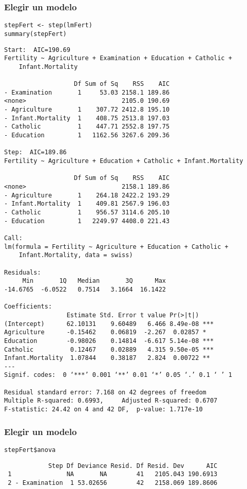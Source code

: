 \documentclass{beamer}
\begin{document}
\begin{frame}[fragile]
\frametitle{Elegir un modelo}
\label{sec-3-11}


\lstset{language=R}
\begin{lstlisting}
stepFert <- step(lmFert)
summary(stepFert)
\end{lstlisting}


\begin{verbatim}
Start:  AIC=190.69
Fertility ~ Agriculture + Examination + Education + Catholic + 
    Infant.Mortality

                   Df Sum of Sq    RSS    AIC
- Examination       1     53.03 2158.1 189.86
<none>                          2105.0 190.69
- Agriculture       1    307.72 2412.8 195.10
- Infant.Mortality  1    408.75 2513.8 197.03
- Catholic          1    447.71 2552.8 197.75
- Education         1   1162.56 3267.6 209.36

Step:  AIC=189.86
Fertility ~ Agriculture + Education + Catholic + Infant.Mortality

                   Df Sum of Sq    RSS    AIC
<none>                          2158.1 189.86
- Agriculture       1    264.18 2422.2 193.29
- Infant.Mortality  1    409.81 2567.9 196.03
- Catholic          1    956.57 3114.6 205.10
- Education         1   2249.97 4408.0 221.43

Call:
lm(formula = Fertility ~ Agriculture + Education + Catholic + 
    Infant.Mortality, data = swiss)

Residuals:
     Min       1Q   Median       3Q      Max 
-14.6765  -6.0522   0.7514   3.1664  16.1422 

Coefficients:
                 Estimate Std. Error t value Pr(>|t|)    
(Intercept)      62.10131    9.60489   6.466 8.49e-08 ***
Agriculture      -0.15462    0.06819  -2.267  0.02857 *  
Education        -0.98026    0.14814  -6.617 5.14e-08 ***
Catholic          0.12467    0.02889   4.315 9.50e-05 ***
Infant.Mortality  1.07844    0.38187   2.824  0.00722 ** 
---
Signif. codes:  0 ‘***’ 0.001 ‘**’ 0.01 ‘*’ 0.05 ‘.’ 0.1 ‘ ’ 1 

Residual standard error: 7.168 on 42 degrees of freedom
Multiple R-squared: 0.6993,     Adjusted R-squared: 0.6707 
F-statistic: 24.42 on 4 and 42 DF,  p-value: 1.717e-10
\end{verbatim}
\end{frame}
\begin{frame}[fragile]
\frametitle{Elegir un modelo}
\label{sec-3-12}


\lstset{language=R}
\begin{lstlisting}
stepFert$anova
\end{lstlisting}

\begin{verbatim}
            Step Df Deviance Resid. Df Resid. Dev      AIC
 1               NA       NA        41   2105.043 190.6913
 2 - Examination  1 53.02656        42   2158.069 189.8606
\end{verbatim}
\end{frame}
\end{document}
